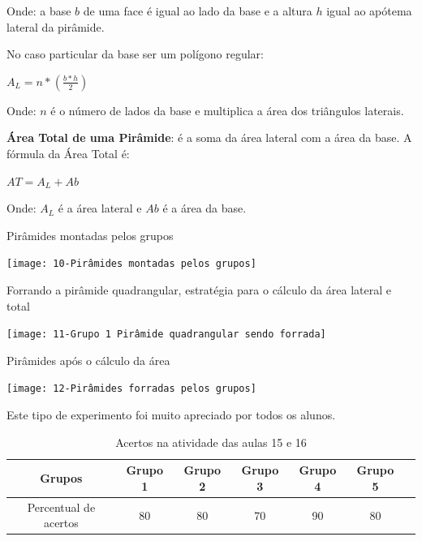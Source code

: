 Onde: a base $b$ de uma face é igual ao lado da base e a altura $h$ igual ao apótema lateral da pirâmide.

No caso particular da base ser um polígono regular:

\textcolor[HTML]{0000FF}{$A_L = n * \left( \frac{b*h}{2}  \right)$}

Onde: $n$ é o número de lados da base e multiplica a área dos triângulos laterais.

\textbf{Área Total de uma Pirâmide}: é a soma da área lateral com a área da base. A fórmula da Área Total é:

\textcolor[HTML]{0000FF}{$AT = A_L + Ab$}

Onde: $A_L$ é a área lateral e $Ab$ é a área da base.

\begin{CenteredFigure}
    \caption{Pirâmides montadas pelos grupos} \label{fig:10-piramides montadas}
    \texttt{[image: 10-Pirâmides montadas pelos grupos]}
    \legend{\autoria}
\end{CenteredFigure}

\begin{CenteredFigure}
    \caption{Forrando a pirâmide quadrangular, estratégia para o cálculo da área lateral e total} \label{fig:11-grupo 1 forrando}
    \texttt{[image: 11-Grupo 1 Pirâmide quadrangular sendo forrada]}
    \legend{\autoria}
\end{CenteredFigure}

\begin{CenteredFigure}
    \caption{Pirâmides após o cálculo da área} \label{fig:12-piramides forradas}
    \texttt{[image: 12-Pirâmides forradas pelos grupos]}
    \legend{\autoria}
\end{CenteredFigure}

Este tipo de experimento foi muito apreciado por todos os alunos.

\begin{table}[htbp] \centering
    \caption{Acertos na atividade das aulas 15 e 16} \label{tab:Acertos do Encontro 8}

    \begin{tabular}{|c|c|c|c|c|c|c|}
        \hline
        \textbf{Grupos}       & \textbf{Grupo 1} & \textbf{Grupo 2} & \textbf{Grupo 3} & \textbf{Grupo 4} & \textbf{Grupo 5} \\
        \hline
        Percentual de acertos & 80               & 80               & 70               & 90               & 80               \\
        \hline
    \end{tabular}
    \legend{\legendaTabela}
\end{table}

